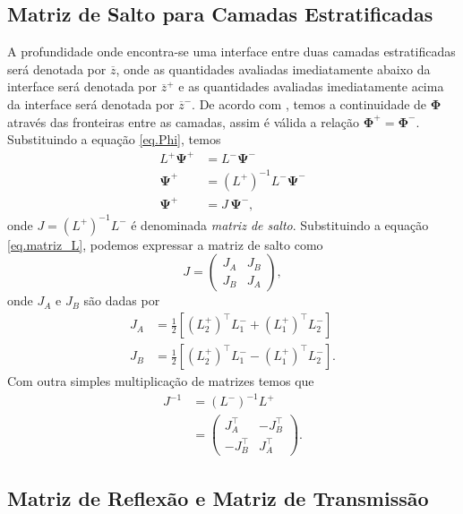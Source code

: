 \subsection{Matriz de Salto para Camadas Estratificadas}

A profundidade onde encontra-se uma interface entre duas camadas estratificadas ser\'a denotada por $\overline{z}$, onde as quantidades avaliadas imediatamente abaixo da interface ser\'a denotada por $\overline{z}^+$ e as quantidades avaliadas imediatamente acima da interface ser\'a denotada por $\overline{z}^-$.
De acordo com \cite{White_Zhou_2006}, temos a continuidade de $\mathbf{\Phi}$ atrav\'es das fronteiras entre as camadas, assim \'e v\'alida a rela\c{c}\~ao $\mathbf{\Phi}^+=\mathbf{\Phi}^-$. Substituindo a equa\c{c}\~ao \ref{eq.Phi}, temos 
\begin{align}\nonumber
L^+\mathbf{\Psi}^+&=L^-\mathbf{\Psi}^-\\\nonumber
\mathbf{\Psi}^+&=(L^+)^{-1}L^-\mathbf{\Psi}^-\\\label{eq.psi_matriz_salto}
\mathbf{\Psi}^+&=J\,\mathbf{\Psi}^-,
\end{align}
onde $J=(L^+)^{-1}L^-$ \'e denominada \textit{matriz de salto}. Substituindo a equa\c{c}\~ao \ref{eq.matriz_L}, podemos expressar a matriz de salto como
\begin{equation}
J=
\begin{pmatrix}
J_A&J_B\\
J_B&J_A
\end{pmatrix},
\end{equation}
onde $J_A$ e $J_B$ s\~ao dadas por
\begin{align}\label{eq.j_a}
J_A&=\frac{1}{2}\left[(L_2^+)^\top L_1^-+(L_1^+)^\top L_2^-\right]\\\label{eq.j_b}
J_B&=\frac{1}{2}\left[(L_2^+)^\top L_1^--(L_1^+)^\top L_2^-\right].
\end{align}
Com outra simples multiplica\c{c}\~ao de matrizes temos que
\begin{align}\nonumber
J^{-1}&=(L^-)^{-1}L^+\\\label{eq.inversa_matriz_salto}
&=
\begin{pmatrix}
J_A^\top&-J_B^\top\\
-J_B^\top&J_A^\top
\end{pmatrix}.
\end{align}

\subsection{Matriz de Reflex\~ao e Matriz de Transmiss\~ao}

